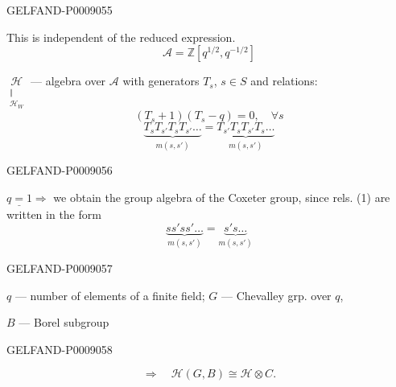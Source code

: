 \begin{GelfandAdjacentEvidence}{GELFAND-P000905}{5}


This is independent of the reduced expression.
\[
\mathcal A=\mathbb Z[q^{1/2},q^{-1/2}]
\]


$\underset{\substack{\Vert\\\mathcal H_W}}{\mathcal H}$ --- algebra over $\mathcal A$ with generators $T_s$, $s\in S$ and relations:
\begin{equation*}
(T_s+1)(T_s-q)=0,\quad\forall s
\tag*{$(4)_1$}
\end{equation*}
\begin{equation*}
\underbrace{T_sT_{s'}T_sT_{s'}\ldots}_{m(s,s')}
=\underbrace{T_{s'}T_sT_{s'}T_s\ldots}_{m(s,s')}
\tag*{$(4)_2$}
\end{equation*}
\end{GelfandAdjacentEvidence}
\begin{GelfandAdjacentEvidence}{GELFAND-P000905}{6}


\(\underline{q=1}\Rightarrow\) we obtain the group algebra of the Coxeter group, since rels. (1) are written in the form
\begin{equation*}
\underbrace{ss'ss'\ldots}_{m(s,s')}
=\underbrace{s's\ldots}_{m(s,s')}
\tag{5}
\end{equation*}
\end{GelfandAdjacentEvidence}
\begin{GelfandAdjacentEvidence}{GELFAND-P000905}{7}


$q$ --- number of elements of a finite field; $G$ --- Chevalley grp. over $q$,

$B$ --- Borel subgroup
\end{GelfandAdjacentEvidence}
\begin{GelfandAdjacentEvidence}{GELFAND-P000905}{8}


\[
\Rightarrow\quad \mathcal H(G,B)\cong\mathcal H\otimes C.
\]
\end{GelfandAdjacentEvidence}



